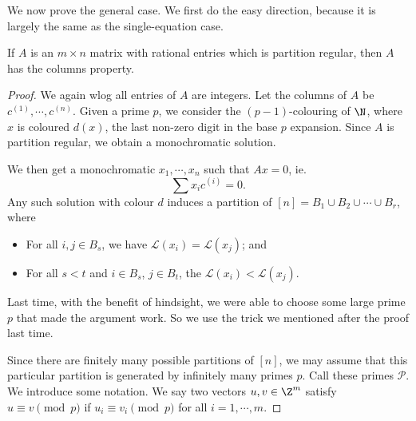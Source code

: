 \documentclass[a4paper]{article}
\begin{document}
We now prove the general case. We first do the easy direction, because it is largely the same as the single-equation case.

\begin{prop}
  If $A$ is an $m \times n$ matrix with rational entries which is partition regular, then $A$ has the columns property.
\end{prop}

\begin{proof}
  We again wlog all entries of $A$ are integers. Let the columns of $A$ be $c^{(1)}, \cdots, c^{(n)}$. Given a prime $p$, we consider the $(p - 1)$-colouring of $\N$, where $x$ is coloured $d(x)$, the last non-zero digit in the base $p$ expansion. Since $A$ is partition regular, we obtain a monochromatic solution.

  We then get a monochromatic $x_1, \cdots, x_n$ such that $Ax = 0$, ie.
  \[
    \sum x_i c^{(i)} = 0.
  \]
  Any such solution with colour $d$ induces a partition of $[n] = B_1 \cup B_2 \cup \cdots \cup B_r$, where
  \begin{itemize}
    \item For all $i, j \in B_s$, we have $\mathcal{L}(x_i) = \mathcal{L}(x_j)$; and
    \item For all $s < t$ and $i \in B_s$, $j \in B_t$, the $\mathcal{L}(x_i) < \mathcal{L}(x_j)$.
  \end{itemize}
  Last time, with the benefit of hindsight, we were able to choose some large prime $p$ that made the argument work. So we use the trick we mentioned after the proof last time.

  Since there are finitely many possible partitions of $[n]$, we may assume that this particular partition is generated by infinitely many primes $p$. Call these primes $\mathcal{P}$. We introduce some notation. We say two vectors $u, v \in \Z^m$ satisfy $u \equiv v \pmod p$ if $u_i \equiv v_i \pmod p$ for all $i = 1, \cdots, m$.


\end{proof}
\end{document}
